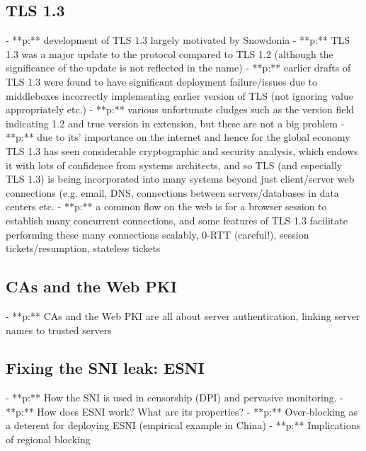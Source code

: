 \subsection{TLS 1.3}
      - **p:** development of TLS 1.3 largely motivated by Snowdonia
      - **p:** TLS 1.3 was a major update to the protocol compared to TLS 1.2 (although the significance of the update is not reflected in the name)
      - **p:** earlier drafts of TLS 1.3 were found to have significant deployment failure/issues due to middleboxes incorrectly implementing earlier version of TLS (not ignoring value appropriately etc.)
      - **p:** various unfortunate cludges such as the version field indicating 1.2 and true version in  extension, but these are not a big problem
      - **p:** due to its' importance on the internet and hence for the global economy TLS 1.3 has seen considerable cryptographic and security analysis, which endows it with lots of confidence from systems architects, and so TLS (and especially TLS 1.3) is being incorporated into many systems beyond just client/server web connections (e.g. email, DNS, connections between servers/databases in data centers etc.
      - **p:** a common flow on the web is for a browser session to establish many concurrent connections, and some features of TLS 1.3 facilitate performing these many connections scalably, 0-RTT (careful!), session tickets/resumption, stateless tickets
\subsection{CAs and the Web PKI}
      - **p:** CAs and the Web PKI are all about server authentication, linking server names to trusted servers
\subsection{Fixing the SNI leak: ESNI}
      - **p:** How the SNI is used in censorship (DPI) and pervasive monitoring.
      - **p:** How does ESNI work? What are its properties?
      - **p:** Over-blocking as a deterent for deploying ESNI (empirical example in China)
      - **p:** Implications of regional blocking

